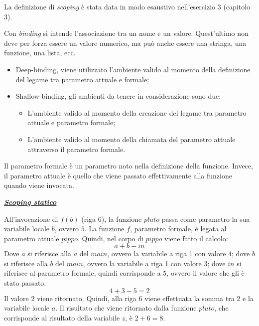 \documentclass[a4paper]{article}
\begin{document}
	\noindent
	La definizione di \emph{scoping} è stata data in modo esaustivo nell'esercizio 3 (capitolo 3).\newline
	
	\noindent
	Con \emph{binding} si intende l'associazione tra un nome e un valore. Quest'ultimo non deve per forza essere un valore numerico, ma può anche essere una stringa, una funzione, una lista, ecc.
	\begin{itemize}
		\item Deep-binding, viene utilizzato l'ambiente valido al momento della definizione del legame tra parametro attuale e formale;
		
		\item Shallow-binding, gli ambienti da tenere in considerazione sono due:
		\begin{itemize}
			\item L'ambiente valido al momento della creazione del legame tra parametro attuale e parametro formale;
			
			\item L'ambiente valido al momento della chiamata del parametro attuale attraverso il parametro formale.
		\end{itemize}
	\end{itemize}
	Il parametro formale è un parametro noto nella definizione della funzione. Invece, il parametro attuale è quello che viene passato effettivamente alla funzione quando viene invocata.\newpage
	
	\begin{center}
		\textbf{\emph{\underline{Scoping statico}}}
	\end{center}
	
	\noindent
	All'invocazione di $f\left(b\right)$ (riga 6), la funzione $pluto$ passa come parametro la sua variabile locale $b$, ovvero $5$. La funzione $f$, parametro formale, è legata al parametro attuale $pippo$. Quindi, nel corpo di $pippo$ viene fatto il calcolo:
	\begin{equation*}
		a + b - in
	\end{equation*}
	Dove $a$ si riferisce alla $a$ del $main$, ovvero la variabile a riga 1 con valore $4$; dove $b$ si riferisce alla $b$ del $main$, ovvero la variabile a riga 1 con valore $3$; dove $in$ si riferisce al parametro formale, quindi corrisponde a $5$, ovvero il valore che gli è stato passato.
	\begin{equation*}
		4 + 3 - 5 = 2
	\end{equation*}
	Il valore $2$ viene ritornato. Quindi, alla riga 6 viene effettuata la somma tra $2$ e la variabile locale $a$. Il risultato che viene ritornato dalla funzione $pluto$, che corrisponde al risultato della variabile $z$, è $2+6=8$.
	
\end{document}
